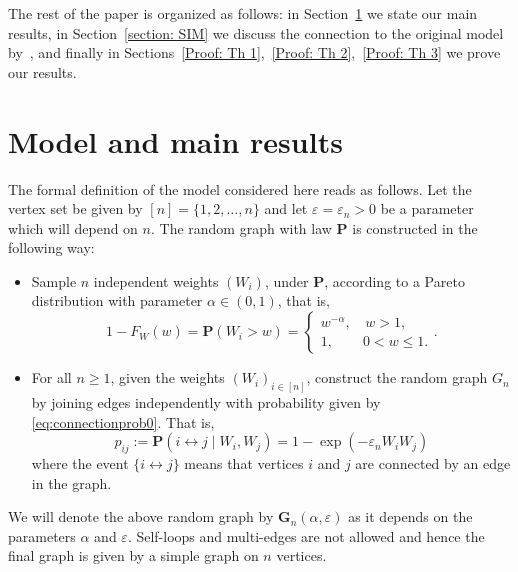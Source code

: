 \documentclass[11pt, reqno]{amsart}
\makeatletter
\numberwithin{equation}{section}
\def\paragraph{\@startsection{paragraph}{4}%
  \z@\z@{-\fontdimen2\font}%
  {\normalfont\itshape}}
\theoremstyle{plain} %
\theoremstyle{definition} %
\newcommand{\eps}{\varepsilon}
\newcommand{\prob}{\mathbf{P}}
\makeatother
\begin{document}
The rest of the paper is organized as follows: in Section~\ref{Section: Model and main results} we state our main results, in Section~\ref{section: SIM} we discuss the connection to the original model by~\cite{GMD2020}, and finally in Sections~\ref{Proof: Th 1},~\ref{Proof: Th 2},~\ref{Proof: Th 3} we prove our results.




\section{Model and main results}  \label{Section: Model and main results}
The formal definition of the model considered here reads as follows.
Let the vertex set be given by $[n]= \{1,2, \ldots, n\}$ and  let $\eps=\eps_n>0$ be a parameter which will depend on $n$. The random graph with law $\prob$ is constructed in the following way:
\begin{itemize}
\item[(a)] Sample $n$ independent weights $(W_i)$, under $\prob$, according to a Pareto distribution with parameter $\alpha\in (0, 1)$, that is, 
\begin{equation}\label{eq:distF}
1- F_W(w)=\prob(W_i> w)=\begin{cases} w^{-\alpha}, & \,  w>1,\\ 1,& 0< w\le 1.\end{cases}.
\end{equation}

\item[(b)] For all $n\ge 1$,  given the weights $(W_i)_{i\in [n]}$, construct the random graph $G_n$ by joining edges independently with probability given by \eqref{eq:connectionprob0}. That is, 
\begin{equation}\label{eq:connectionprob}p_{ij}:=\prob( i \leftrightarrow j\mid W_i, W_j)= 1-\exp(- \eps_n W_i W_j)\end{equation}
where the event $\{i\leftrightarrow j\}$ means that vertices $i$ and $j$ are connected by an edge in the graph.
\end{itemize}
We will denote the above random graph by $\mathbf{G}_n(\alpha,\eps)$ as it depends on the parameters $\alpha$ and $\eps$. 
Self-loops and multi-edges are not allowed and hence the final graph is given by a simple graph on $n$ vertices. \\
\end{document}
